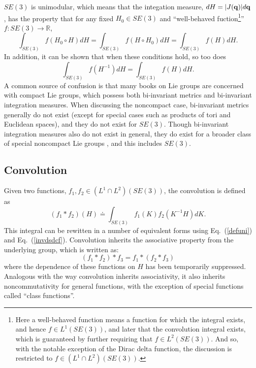 \documentclass[twocolumn,10pt]{asme2ej}
\begin{document}
$SE(3)$ is unimodular, which means that the integation measure, $dH = |J({\bf q})| d{\bf q}$, has the property that for any
fixed $H_0 \in SE(3)$ and ``well-behaved fuction\footnote{Here a well-behaved function means a function for which the integral exists, and hence
$f \in L^1(SE(3))$, and later that the convolution integral exists, which is guaranteed by further requiring that
$f \in L^2(SE(3))$. And so, with the notable exception of the Dirac delta function, the discussion is restricted to
$f \in (L^1 \cap L^2)(SE(3))$.}'' $f:SE(3) \rightarrow \mathbb{R}$, \cite{myoldbook}
\begin{equation}
\int_{SE(3)} f(H_0 \circ H) dH = \int_{SE(3)} f(H \circ H_0) dH = \int_{SE(3)} f(H) dH.
\label{defuni}
\end{equation}
In addition, it can be shown that when these conditions hold, so too does
\begin{equation}
\int_{SE(3)} f(H^{-1}) dH = \int_{SE(3)} f(H) dH.
\label{invdsdcf}
\end{equation}
A common source of confusion is that many books on Lie groups are concerned with compact Lie groups, which possess both bi-invariant metrics
and bi-invariant integration measures. When discussing the noncompact case, bi-invariant metrics generally do not exist (except for special cases
such as products of tori and Euclidean spaces), and they do not exist for $SE(3)$. Though bi-invariant integration measures also do not exist in general,
they do exist for a broader class of special noncompact Lie groups%
, and this includes $SE(3)$. 

\subsection*{Convolution} \label{convsec}

Given two functions, $f_1, f_2 \in (L^1 \cap L^2)(SE(3))$, the convolution is defined as
\begin{equation}
(f_1 * f_2)(H) \doteq \int_{SE(3)} f_1(K) f_2(K^{-1} H) dK. 
\label{convdef}
\end{equation}
This integral can be rewitten in a number of equivalent forms using Eq.~(\ref{defuni}) and Eq.~(\ref{invdsdcf}).
Convolution inherits the associative property from the underlying group, which is written as:
\begin{equation}
(f_1 * f_2) * f_3 = f_1 * (f_2 * f_3)
\end{equation} 
where the dependence of these functions on $H$ has been temporarily suppressed. Analogous with the way convolution inherits associativity, it 
also inherits noncommutativity for general functions, with the exception of special functions called ``class functions''.
\end{document}
